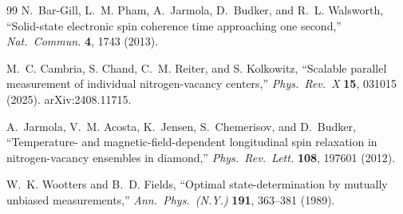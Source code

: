 \documentclass[11pt,letterpaper]{article}
\begin{document}
\begin{thebibliography}{99}
N.~Bar-Gill, L.~M. Pham, A.~Jarmola, D.~Budker, and R.~L. Walsworth,
``Solid-state electronic spin coherence time approaching one second,''
\emph{Nat.\ Commun.} \textbf{4}, 1743 (2013).

M.~C. Cambria, S. Chand, C.~M. Reiter, and S. Kolkowitz,
``Scalable parallel measurement of individual nitrogen-vacancy centers,''
\emph{Phys.\ Rev.\ X} \textbf{15}, 031015 (2025).
arXiv:2408.11715.

A.~Jarmola, V.~M. Acosta, K.~Jensen, S.~Chemerisov, and D.~Budker,
``Temperature- and magnetic-field-dependent longitudinal spin relaxation in
nitrogen-vacancy ensembles in diamond,''
\emph{Phys.\ Rev.\ Lett.} \textbf{108}, 197601 (2012).

W.~K. Wootters and B.~D. Fields,
``Optimal state-determination by mutually unbiased measurements,''
\emph{Ann.\ Phys.\ (N.Y.)} \textbf{191}, 363--381 (1989).

\end{thebibliography}
\end{document}
